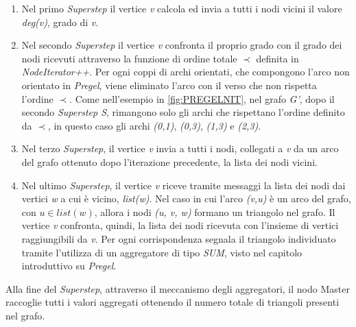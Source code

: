 \documentclass[LaM,binding=0.6cm]{sapthesis}
\begin{document}
\begin{enumerate}
\item Nel primo \textit{Superstep} il vertice \textit{v} calcola ed invia a tutti i nodi vicini il valore \textit{deg(v)}, grado di \textit{v}. 

\item Nel secondo \textit{Superstep} il vertice \textit{v} confronta il proprio grado con il grado dei nodi ricevuti attraverso la funzione di ordine totale $\prec$ definita in \textit{NodeIterator++}. 
Per ogni coppi di archi orientati, che compongono l'arco non orientato in \textit{Pregel}, viene eliminato l'arco con il verso che non rispetta l'ordine $\prec$.
Come nell'esempio in \ref{fig:PREGELNIT}, nel grafo \textit{G'}, dopo il secondo \textit{Superstep S}, rimangono solo gli archi che rispettano l'ordine definito da $\prec$, in questo caso gli archi \textit{(0,1)}, \textit{(0,3)}, \textit{(1,3)} e \textit{(2,3)}.

\item Nel terzo \textit{Superstep}, il vertice \textit{v} invia a tutti i nodi, collegati a \textit{v} da un arco del grafo ottenuto dopo l'iterazione precedente, la lista dei nodi vicini.

\item Nel ultimo \textit{Superstep}, il vertice \textit{v} riceve tramite messaggi la lista dei nodi dai vertici \textit{w} a cui è vicino, \textit{list(w)}. Nel caso in cui l'arco \textit{(v,u)} è un arco del grafo, con \textit{$u \in list(w)$}, allora i nodi \textit{(u, v, w)} formano un triangolo nel grafo. 
Il vertice \textit{v} confronta, quindi, la lista dei nodi ricevuta con l'insieme di vertici raggiungibili da \textit{v}. 
Per ogni corrispondenza segnala il triangolo individuato tramite l'utilizza di un aggregatore di tipo \textit{SUM}, visto nel capitolo introduttivo su \textit{Pregel}.
\end{enumerate}

Alla fine del \textit{Superstep}, attraverso il meccanismo degli aggregatori, il nodo Master raccoglie tutti i valori aggregati ottenendo il numero totale di triangoli presenti nel grafo.

	
\end{document}
